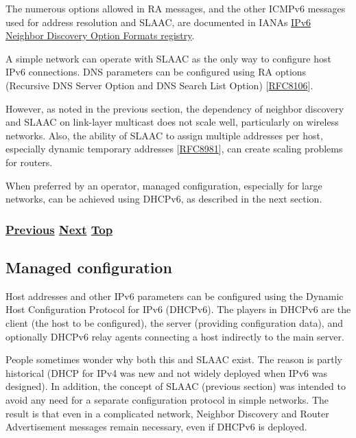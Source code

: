 \documentclass[
]{article}
\begin{document}
The numerous options allowed in RA messages, and the other ICMPv6
messages used for address resolution and SLAAC, are documented in
IANA\textquotesingle s
\href{https://www.iana.org/assignments/icmpv6-parameters/icmpv6-parameters.xhtml\#icmpv6-parameters-5}{IPv6
Neighbor Discovery Option Formats registry}.

A simple network can operate with SLAAC as the only way to configure
host IPv6 connections. DNS parameters can be configured using RA options
(Recursive DNS Server Option and DNS Search List Option)
{[}\href{https://www.rfc-editor.org/info/rfc8106}{RFC8106}{]}.

However, as noted in the previous section, the dependency of neighbor
discovery and SLAAC on link-layer multicast does not scale well,
particularly on wireless networks. Also, the ability of SLAAC to assign
multiple addresses per host, especially dynamic temporary addresses
{[}\href{https://www.rfc-editor.org/info/rfc8981}{RFC8981}{]}, can
create scaling problems for routers.

When preferred by an operator, managed configuration, especially for
large networks, can be achieved using DHCPv6, as described in the next
section.

\subsubsection{\texorpdfstring{\hyperref[address-resolution]{Previous}
\hyperref[managed-configuration]{Next}
\hyperref[ipv6-basic-technology]{Top}}{Previous Next Top}}\label{previous-next-top-12}

\pagebreak

\subsection{Managed configuration}\label{managed-configuration}

Host addresses and other IPv6 parameters can be configured using the
Dynamic Host Configuration Protocol for IPv6 (DHCPv6). The players in
DHCPv6 are the client (the host to be configured), the server (providing
configuration data), and optionally DHCPv6 relay agents connecting a
host indirectly to the main server.

People sometimes wonder why both this and SLAAC exist. The reason is
partly historical (DHCP for IPv4 was new and not widely deployed when
IPv6 was designed). In addition, the concept of SLAAC (previous section)
was intended to avoid any need for a separate configuration protocol in
simple networks. The result is that even in a complicated network,
Neighbor Discovery and Router Advertisement messages remain necessary,
even if DHCPv6 is deployed.
\end{document}

